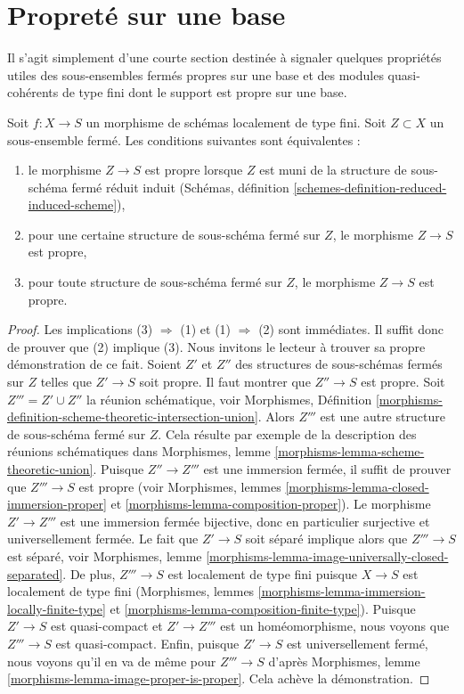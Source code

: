 \section{Propreté sur une base}
\label{section-proper-over-base}

\noindent
Il s'agit simplement d'une courte section destinée à signaler quelques propriétés utiles des sous-ensembles
fermés propres sur une base et des modules quasi-cohérents de type fini
dont le support est propre sur une base.

\begin{lemma}
\label{lemma-closed-proper-over-base}
Soit $f : X \to S$ un morphisme de schémas localement de type fini.
Soit $Z \subset X$ un sous-ensemble fermé. Les conditions suivantes sont équivalentes :
\begin{enumerate}
\item le morphisme $Z \to S$ est propre lorsque $Z$ est muni de la structure
de sous-schéma fermé réduit induit
(Schémas, définition \ref{schemes-definition-reduced-induced-scheme}),
\item pour une certaine structure de sous-schéma fermé sur $Z$, le morphisme $Z \to S$
est propre,
\item pour toute structure de sous-schéma fermé sur $Z$, le morphisme
$Z \to S$ est propre.
\end{enumerate}
\end{lemma}

\begin{proof}
Les implications (3) $\Rightarrow$ (1) et (1) $\Rightarrow$ (2)
sont immédiates. Il suffit donc de prouver que (2) implique (3).
Nous invitons le lecteur à trouver sa propre démonstration de ce fait.
Soient $Z'$ et $Z''$ des structures de sous-schémas fermés sur $Z$
telles que $Z' \to S$ soit propre. Il faut montrer que $Z'' \to S$ est propre.
Soit $Z''' = Z' \cup Z''$ la réunion schématique, voir
Morphismes, Définition
\ref{morphisms-definition-scheme-theoretic-intersection-union}.
Alors $Z'''$ est une autre structure de sous-schéma fermé sur $Z$.
Cela résulte par exemple de la description des réunions schématiques dans
Morphismes, lemme \ref{morphisms-lemma-scheme-theoretic-union}.
Puisque $Z'' \to Z'''$ est une immersion fermée, il suffit de prouver
que $Z''' \to S$ est propre (voir
Morphismes, lemmes \ref{morphisms-lemma-closed-immersion-proper} et
\ref{morphisms-lemma-composition-proper}).
Le morphisme $Z' \to Z'''$ est une immersion fermée bijective,
donc en particulier surjective et universellement
fermée. Le fait que $Z' \to S$ soit séparé implique alors que
$Z''' \to S$ est séparé, voir
Morphismes, lemme \ref{morphisms-lemma-image-universally-closed-separated}. De
plus, $Z''' \to S$ est localement de type fini
puisque $X \to S$ est localement de type fini
(Morphismes, lemmes \ref{morphisms-lemma-immersion-locally-finite-type} et
\ref{morphisms-lemma-composition-finite-type}).
Puisque $Z' \to S$ est quasi-compact et $Z' \to Z'''$ est un homéomorphisme,
nous voyons que $Z''' \to S$ est quasi-compact.
Enfin, puisque $Z' \to S$ est universellement fermé, nous voyons qu'il
en va de même pour $Z''' \to S$ d'après
Morphismes, lemme \ref{morphisms-lemma-image-proper-is-proper}.
Cela achève la démonstration.
\end{proof}

